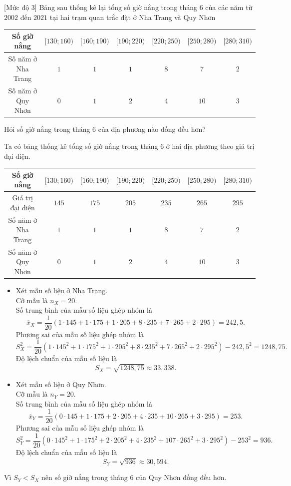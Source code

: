 \begin{bt}%
[Mức độ 3]%
	Bảng sau thống kê lại tổng số giờ nắng trong tháng $6$ của các năm từ $2002$ đến $2021$ tại hai trạm quan trắc đặt ở Nha Trang và Quy Nhơn
	\begin{center}
		\begin{tabular}{|c|c|c|c|c|c|c|}
			\hline
			Số giờ nắng &$[130;160)$  & $[160;190)$ & $[190;220)$ & $[220;250)$ & $[250;280)$ & $[280;310)$\\
			\hline
			Số năm ở Nha Trang	& $1$ & $1$ & $1$ & $8$ & $7$ & $2$\\
			\hline
			Số năm ở Quy Nhơn & $0$ & $1$ & $2$ & $4$ & $10$ & $3$\\
			\hline
		\end{tabular}
	\end{center}
	Hỏi số giờ nắng trong tháng $6$ của địa phương nào đồng đều hơn?
	\loigiai 
	{
		Ta có bảng thống kê tổng số giờ nắng trong tháng 6 ở hai địa phương theo giá trị đại diện.
		\begin{center}
			\begin{tabular}{|c|c|c|c|c|c|c|}
				\hline
				Số giờ nắng &$[130;160)$  & $[160;190)$ & $[190;220)$ & $[220;250)$ & $[250;280)$ & $[280;310)$\\
				\hline
				Giá trị đại diện &$145$  & $175$ & $205$ & $235$ & $265$ & $295$\\
				\hline
				Số năm ở Nha Trang	& $1$ & $1$ & $1$ & $8$ & $7$ & $2$ \\
				\hline
				Số năm ở Quy Nhơn & $0$ & $1$ & $2$ & $4$ & $10$ & $3$ \\
				\hline
			\end{tabular}
		\end{center}
		\begin{itemize}
			\item Xét mẫu số liệu ở Nha Trang.\\
			Cỡ mẫu là $n_X=20$.\\
			Số trung bình của mẫu số liệu ghép nhóm là 
			$$\overline{x}_X=\dfrac{1}{20}\left(1\cdot 145+1\cdot 175+1\cdot 205+8\cdot 235+7\cdot 265+2\cdot 295\right)=242{,}5.$$
			Phương sai của mẫu số liệu ghép nhóm là
			$$S^2_X=\dfrac{1}{20}\left(1\cdot 145^2+1\cdot 175^2+1\cdot 205^2+8\cdot 235^2+7\cdot 265^2+2\cdot 295^2\right)-242{,}5^2=1248{,}75.$$
			Độ lệch chuẩn của mẫu số liệu là 
			$$S_X=\sqrt{1248{,}75}\approx 33{,}338.$$
			\item Xét mẫu số liệu ở Quy Nhơn.\\
			Cỡ mẫu là $n_Y=20$.\\
			Số trung bình của mẫu số liệu ghép nhóm là 
			$$\overline{x}_Y=\dfrac{1}{20}\left(0\cdot 145+1\cdot 175+2\cdot 205+4\cdot 235+10\cdot 265+3\cdot 295\right)=253.$$
			Phương sai của mẫu số liệu ghép nhóm là
			$$S^2_Y=\dfrac{1}{20}\left(0\cdot 145^2+1\cdot 175^2+2\cdot 205^2+4\cdot 235^2+107\cdot 265^2+3\cdot 295^2\right)-253^2=936.$$
			Độ lệch chuẩn của mẫu số liệu là 
			$$S_Y=\sqrt{936}\approx 30{,}594.$$
		\end{itemize}
		Vì $S_Y<S_X$ nên số giờ nắng trong tháng 6 của Quy Nhơn đồng đều hơn.
	}
\end{bt}

